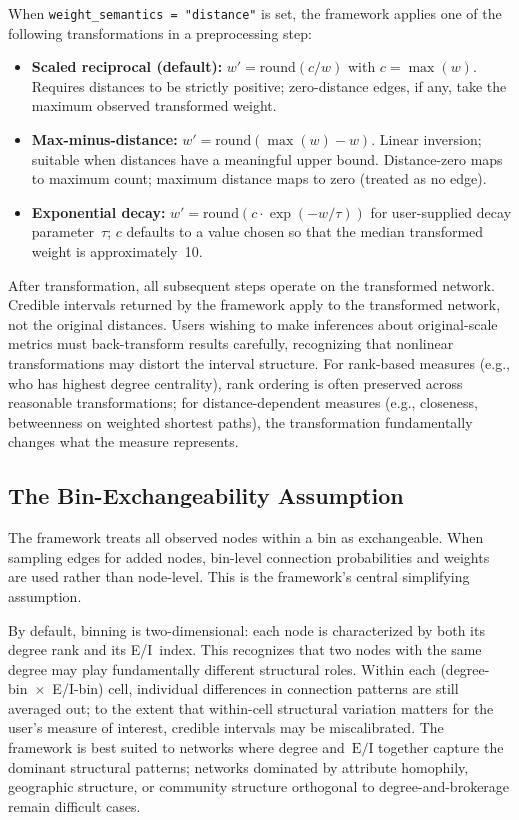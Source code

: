 \documentclass[11pt]{article}
\newcommand{\EI}{\text{E/I}}
\begin{document}
When \texttt{weight\_semantics = "distance"} is set, the framework applies one of the following transformations in a preprocessing step:
\begin{itemize}[leftmargin=*, itemsep=2pt]
  \item \textbf{Scaled reciprocal (default):} $w' = \mathrm{round}(c / w)$ with $c = \max(w)$. Requires distances to be strictly positive; zero-distance edges, if any, take the maximum observed transformed weight.
  \item \textbf{Max-minus-distance:} $w' = \mathrm{round}(\max(w) - w)$. Linear inversion; suitable when distances have a meaningful upper bound. Distance-zero maps to maximum count; maximum distance maps to zero (treated as no edge).
  \item \textbf{Exponential decay:} $w' = \mathrm{round}(c \cdot \exp(-w / \tau))$ for user-supplied decay parameter~$\tau$; $c$ defaults to a value chosen so that the median transformed weight is approximately~10.
\end{itemize}
After transformation, all subsequent steps operate on the transformed network. Credible intervals returned by the framework apply to the transformed network, not the original distances. Users wishing to make inferences about original-scale metrics must back-transform results carefully, recognizing that nonlinear transformations may distort the interval structure. For rank-based measures (e.g., who has highest degree centrality), rank ordering is often preserved across reasonable transformations; for distance-dependent measures (e.g., closeness, betweenness on weighted shortest paths), the transformation fundamentally changes what the measure represents.

\subsection{The Bin-Exchangeability Assumption}

The framework treats all observed nodes within a bin as exchangeable. When sampling edges for added nodes, bin-level connection probabilities and weights are used rather than node-level. This is the framework's central simplifying assumption.

By default, binning is two-dimensional: each node is characterized by both its degree rank and its E/I~index. This recognizes that two nodes with the same degree may play fundamentally different structural roles. Within each (degree-bin~$\times$~E/I-bin) cell, individual differences in connection patterns are still averaged out; to the extent that within-cell structural variation matters for the user's measure of interest, credible intervals may be miscalibrated. The framework is best suited to networks where degree and~$\EI$ together capture the dominant structural patterns; networks dominated by attribute homophily, geographic structure, or community structure orthogonal to degree-and-brokerage remain difficult cases.
\end{document}
